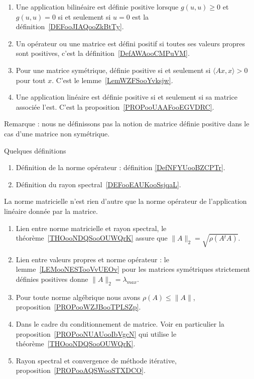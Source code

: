         \label{THEMEooYEVLooWotqMY}
\begin{enumerate}
    \item
        Une application bilinéaire est définie positive lorsque \( g(u,u)\geq 0\) et \( g(u,u)=0\) si et seulement si \( u=0\) est la définition~\ref{DEFooJIAQooZkBtTy}.
    \item
        Un opérateur ou une matrice est défini positif si toutes ses valeurs propres sont positives, c'est la définition~\ref{DefAWAooCMPuVM}.
    \item
        Pour une matrice symétrique, définie positive si et seulement si \( \langle Ax, x\rangle >0\) pour tout \( x\). C'est le lemme~\ref{LemWZFSooYvksjw}.
    \item
        Une application linéaire est définie positive si et seulement si sa matrice associée l'est. C'est la proposition~\ref{PROPooUAAFooEGVDRC}.
\end{enumerate}
Remarque : nous ne définissons pas la notion de matrice définie positive dans le cas d'une matrice non symétrique.

     \label{THEMEooOJJFooWMSAtL}

Quelques définitions
\begin{enumerate}
    \item
        Définition de la norme opérateur : définition \ref{DefNFYUooBZCPTr}.
    \item
        Définition du rayon spectral~\ref{DEFooEAUKooSsjqaL}.
\end{enumerate}

    La norme matricielle n'est rien d'autre que la norme opérateur de l'application linéaire donnée par la matrice.

    \begin{enumerate}
        \item
            Lien entre norme matricielle et rayon spectral, le théorème~\ref{THOooNDQSooOUWQrK} assure que $\|A\|_2=\sqrt{\rho(A{^t}A)}$.
        \item
            Lien entre valeurs propres et norme opérateur : le lemme~\ref{LEMooNESTooVvUEOv} pour les matrices symétriques strictement définies positives donne \( \| A \|_2=\lambda_{max}\).
        \item
            Pour toute norme algébrique nous avons \( \rho(A)\leq \| A \|\), proposition~\ref{PROPooWZJBooTPLSZp}.
        \item
            Dans le cadre du conditionnement de matrice. Voir en particulier la proposition~\ref{PROPooNUAUooIbVgcN} qui utilise le théorème~\ref{THOooNDQSooOUWQrK}.
        \item
            Rayon spectral et convergence de méthode itérative, proposition~\ref{PROPooAQSWooSTXDCO}.
    \end{enumerate}


